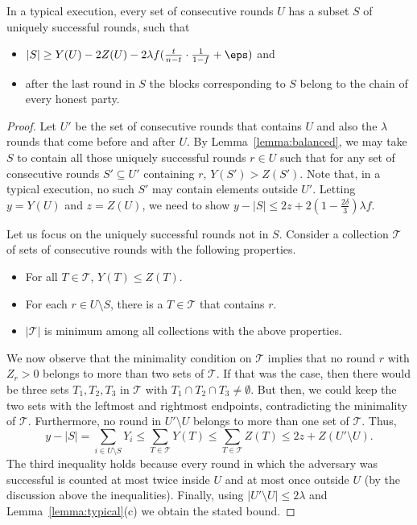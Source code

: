 \begin{lemma}[Unsuppressibility]\label{lem:unsuppressibility}
	In a typical execution,
	every set of consecutive rounds $U$ has a subset\/ $S$ of uniquely
	successful rounds, such that
	\begin{itemize}
		\item
			$|S|\ge Y(U)-2Z(U)-2\lambda f(\frac t{n-t}\cdot\frac1{1-f}+\eps)$ and
		\item
			after the last round in $S$ the blocks corresponding to\/ $S$ belong to
			the chain of every honest party.
	\end{itemize}
\end{lemma}
\begin{proof}
	Let $U'$ be the set of consecutive rounds that contains $U$ and also the
	$\lambda$ rounds that come before and after $U$.
	By Lemma~\ref{lemma:balanced}, we may take $S$ to contain all those uniquely
	successful rounds $r\in U$ such that for any set of consecutive rounds
	$S' \subseteq U'$ containing $r$, $Y(S')>Z(S')$. Note that, in a typical execution,
	no such $S'$ may contain elements outside $U'$.
	Letting $y=Y(U)$ and $z=Z(U)$, we
	need to show $y-|S|\le2z+2(1-\frac{2\delta}{3})\lambda f$.

	Let us focus on the uniquely successful rounds not in $S$.
	Consider a collection $\mathcal{T}$ of sets of consecutive rounds with the
	following properties.
	\begin{itemize}
		\item
			For all $T\in\mathcal{T}$, $Y(T)\leq Z(T)$.
		\item
			For each $r\in U\setminus S$, there is a $T\in\mathcal{T}$ that contains $r$.
		\item
			$|\mathcal{T}|$ is minimum among all collections with the above properties.
	\end{itemize}
	We now observe that the minimality condition on $\mathcal{T}$ implies that no round
	$r$ with $Z_r>0$ belongs to more than two sets of $\mathcal{T}$. If that was the
	case, then there would be three sets $T_1,T_2,T_3$ in $\mathcal{T}$ with
	$T_1\cap T_2\cap T_3\neq\emptyset$. But then, we could keep the two sets
	with the leftmost and rightmost endpoints, contradicting the minimality of
	$\mathcal{T}$. Furthermore, no round in $U'\setminus U$ belongs to more than one set
	of $\mathcal{T}$. Thus,
	\[
		y-|S|=\sum_{i\in U\setminus S}Y_i
			\le\sum_{T\in\mathcal{T}}Y(T)
			\le\sum_{T\in\mathcal{T}}Z(T)
			\le2z+Z(U'\setminus U)
	.\]
	The third inequality holds because every round in which the adversary
	was successful is counted at most twice inside $U$ and at most once outside
	$U$ (by the discussion above the inequalities). Finally,
	using $|U'\setminus U|\le2\lambda$ and Lemma~\ref{lemma:typical}(c) we
	obtain the stated bound.
\end{proof}

